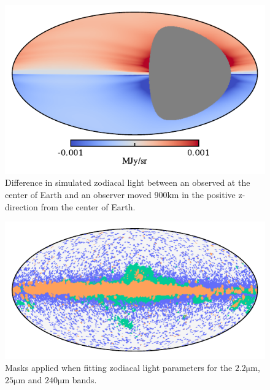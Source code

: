 \documentclass{aa}
\begin{document}
\begin{figure}
    \centering
         \includegraphics[width=\linewidth]{figs/zodi_obs_diff.pdf}
        \caption{Difference in simulated zodiacal light between an observed at the center of Earth and an observer moved 900km in the positive z-direction from the center of Earth.}
      \label{fig: z}
\end{figure}

\begin{figure}
    \centering
        \includegraphics[width=\columnwidth]{figs/mask_zodi_fitting.pdf}
        \caption{Masks applied when fitting zodiacal light parameters for the $2.2\mathrm{\mu m}$, $25\mathrm{\mu m}$ and $240\mathrm{\mu m}$ bands.}
      \label{fig:masks}
\end{figure}
\end{document}
